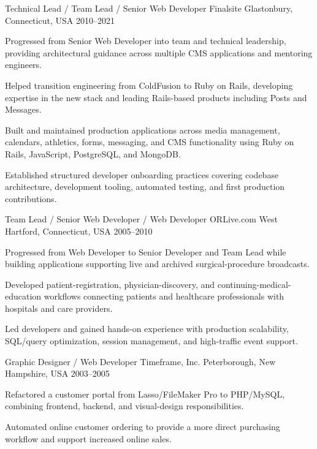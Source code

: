 \documentclass[12pt, letterpaper]{awesome-cv}
\begin{document}
\begin{cventries}
  \cventry
    {Technical Lead / Team Lead / Senior Web Developer}
    {Finalsite}
    {Glastonbury, Connecticut, USA}
    {2010--2021}
    {
      \begin{cvitems}
        \item {Progressed from Senior Web Developer into team and technical leadership, providing architectural guidance across multiple CMS applications and mentoring engineers.}
        \item {Helped transition engineering from ColdFusion to Ruby on Rails, developing expertise in the new stack and leading Rails-based products including Posts and Messages.}
        \item {Built and maintained production applications across media management, calendars, athletics, forms, messaging, and CMS functionality using Ruby on Rails, JavaScript, PostgreSQL, and MongoDB.}
        \item {Established structured developer onboarding practices covering codebase architecture, development tooling, automated testing, and first production contributions.}
      \end{cvitems}
    }

  \newpage
  \cventry
    {Team Lead / Senior Web Developer / Web Developer}
    {ORLive.com}
    {West Hartford, Connecticut, USA}
    {2005--2010}
    {
      \begin{cvitems}
        \item {Progressed from Web Developer to Senior Developer and Team Lead while building applications supporting live and archived surgical-procedure broadcasts.}
        \item {Developed patient-registration, physician-discovery, and continuing-medical-education workflows connecting patients and healthcare professionals with hospitals and care providers.}
        \item {Led developers and gained hands-on experience with production scalability, SQL/query optimization, session management, and high-traffic event support.}
      \end{cvitems}
    }

  \cventry
    {Graphic Designer / Web Developer}
    {Timeframe, Inc.}
    {Peterborough, New Hampshire, USA}
    {2003--2005}
    {
      \begin{cvitems}
        \item {Refactored a customer portal from Lasso/FileMaker Pro to PHP/MySQL, combining frontend, backend, and visual-design responsibilities.}
        \item {Automated online customer ordering to provide a more direct purchasing workflow and support increased online sales.}
      \end{cvitems}
    }
\end{cventries}
\end{document}
